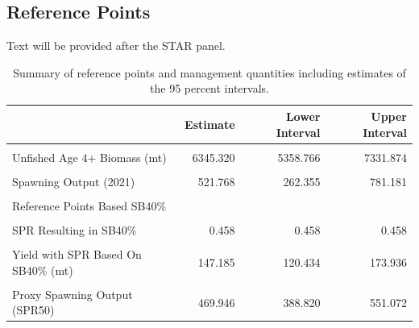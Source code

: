 \documentclass[11pt,
  english,
  a4paper,
]{article}
\begin{document}

\hypertarget{reference-points}{%
\subsection*{Reference Points}\label{reference-points}}

\leavevmode\tagmcend\tagstructend

Text will be provided after the STAR panel.

\begin{table}[H]

\caption{\label{tab:referenceES}Summary of reference points and management quantities including estimates of the 95 percent intervals.}
\centering
\begin{tabular}[t]{lrrr}
\toprule
 & Estimate & Lower Interval & Upper Interval\\
\midrule
\cellcolor{gray!6}{Unfished Spawning Output} & \cellcolor{gray!6}{1053.330} & \cellcolor{gray!6}{871.496} & \cellcolor{gray!6}{1235.164}\\
Unfished Age 4+ Biomass (mt) & 6345.320 & 5358.766 & 7331.874\\
\cellcolor{gray!6}{Unfished Recruitment (R0)} & \cellcolor{gray!6}{785.502} & \cellcolor{gray!6}{556.596} & \cellcolor{gray!6}{1014.408}\\
Spawning Output (2021) & 521.768 & 262.355 & 781.181\\
\cellcolor{gray!6}{Fraction Unfished (2021)} & \cellcolor{gray!6}{0.495} & \cellcolor{gray!6}{0.295} & \cellcolor{gray!6}{0.695}\\
\addlinespace
Reference Points Based SB40\% &  &  & \\
\cellcolor{gray!6}{Proxy Spawning Output SB40\%} & \cellcolor{gray!6}{421.331} & \cellcolor{gray!6}{348.598} & \cellcolor{gray!6}{494.064}\\
SPR Resulting in SB40\% & 0.458 & 0.458 & 0.458\\
\cellcolor{gray!6}{Exploitation Rate Resulting in SB40\%} & \cellcolor{gray!6}{0.128} & \cellcolor{gray!6}{0.114} & \cellcolor{gray!6}{0.142}\\
Yield with SPR Based On SB40\% (mt) & 147.185 & 120.434 & 173.936\\
\addlinespace
\cellcolor{gray!6}{Reference Points Based on SPR Proxy for MSY} & \cellcolor{gray!6}{} & \cellcolor{gray!6}{} & \cellcolor{gray!6}{}\\
Proxy Spawning Output (SPR50) & 469.946 & 388.820 & 551.072\\

\end{tabular}
\end{table}
\end{document}
